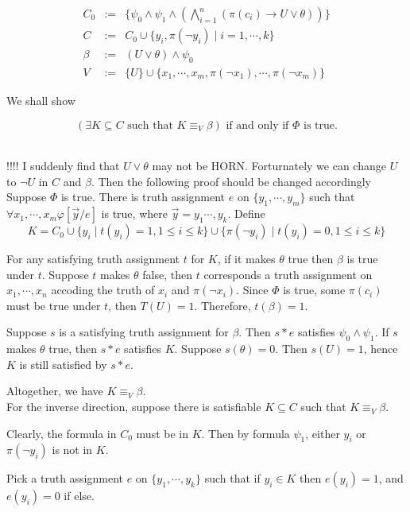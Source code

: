 \documentclass[12pt]{article}
\begin{document}
{$$\begin{array}{lcl}C_0&:=&\{\psi_0\wedge\psi_1 \wedge\left( \bigwedge_{i=1}^n(\pi(c_i)\rightarrow U\vee \theta)\right)\}\\ 

C&:=&C_0\cup \{y_i,\pi(\neg y_i)\mid i=1,\cdots,k\}\\
\beta&:= &(U\vee\theta)\wedge \psi_0 \\
V&:=&\{U\}\cup\{x_1,\cdots,x_m,\pi(\neg x_1),\cdots, \pi(\neg x_m)\}
\end{array}$$

We shall show 

$$(\exists K\subseteq C \text{ such that } K\equiv_V \beta) \text{ if and only if $\Phi$ is true}.$$

\ \\

\color{red} 
!!!! I suddenly find that $U\vee \theta $ may not be HORN. Forturnately we can change $U$ to $\neg U$ in $C$ and $\beta$. Then the following proof should be changed accordingly 
\color{black}\\

Suppose $\Phi$ is true. There is truth assignment
$e$ on $\{y_1,\cdots, y_m\}$ such that $\forall x_1,\cdots,x_m\varphi[\vec{y}/e]$ is true, where $\vec{y}=y_1\cdots,y_k$. Define 
%
$$K=C_0\cup \{y_i\mid t(y_i)=1, 1\leq i\leq k\}\cup \{\pi(\neg y_i)\mid t(y_i)=0, 1\leq i\leq k\}$$

For any satisfying truth assignment $t$ for $K$, if it makes $\theta$ true then $\beta$ is true under $t$. Suppose $t$ makes $\theta$ false, then $t$ corresponds a truth assignment on $x_1,\cdots, x_n$ accoding the truth of $x_i$ and $\pi(\neg x_i)$. Since $\Phi$ is true, some  $\pi(c_i)$ must be true under $t$, then $T(U)=1$. Therefore, $t(\beta)=1$.

Suppose $s$ is a satisfying truth assignment for $\beta$. Then $s*e$ satisfies $\psi_0\wedge \psi_1$. If $s$ makes $\theta$ true, then $s*e$ satisfies $K$. Suppose $s(\theta)=0$. Then $s(U)=1$, hence $K$ is still satisfied by $s*e$. 

Altogether, we have $K\equiv_V\beta$.\\


For the inverse direction, suppose there is satisfiable $K\subseteq C$ such that $K\equiv_V\beta$. 


Clearly, the formula in $C_0$ must be in $K$. Then by formula $\psi_1$, either $y_i$ or  $\pi(\neg y_i)$ is not in $K$. 

Pick a truth assignment $e$ on $\{y_1,\cdots, y_k\}$ such that if $y_i\in K$ then $e(y_i)=1$, and $e(y_i)=0$  if else. 

}
\end{document}
